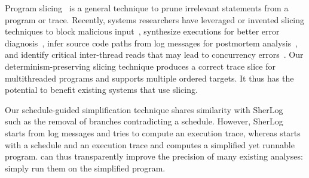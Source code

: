   Program slicing~\cite{Tip:slicing} is a general
technique to prune irrelevant statements from a program or trace.
Recently, systems researchers have leveraged or invented slicing
techniques to block malicious input~\cite{castro:bouncer}, synthesize
executions for better error diagnosis~\cite{esd:eurosys10}, infer source
code paths from log messages for postmortem
analysis~\cite{sherlog:asplos10}, and identify critical inter-thread reads
that may lead to concurrency errors~\cite{conseq:asplos11}.  
Our determinism-preserving slicing technique produces a correct trace slice for
multithreaded programs and supports multiple ordered targets.  It thus has
the potential to benefit existing systems that use slicing.  

Our schedule-guided simplification technique shares similarity with
SherLog~\cite{sherlog:asplos10} such as the removal of branches
contradicting a schedule.  However, SherLog starts from log messages and
tries to compute an execution trace, whereas \peregrine starts with a schedule
and an execution trace and computes a simplified yet runnable program.
\peregrine can thus transparently improve the precision of many existing
analyses: simply run them on the simplified program.




  




